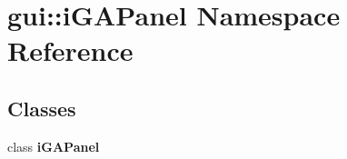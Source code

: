 \section{gui::iGAPanel Namespace Reference}
\label{namespacegui_1_1iGAPanel}


\subsection*{Classes}
\begin{CompactItemize}
\item 
class {\bf iGAPanel}
\end{CompactItemize}
